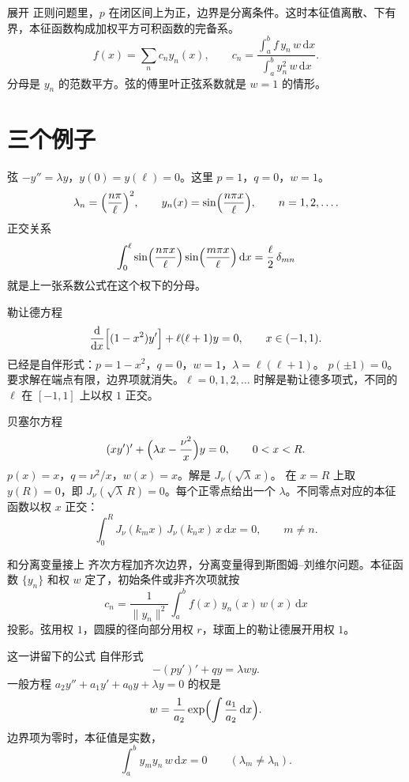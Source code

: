 \documentclass[fontset=windows, chinese, 10pt, xcolor=dvipsnames]{beamer}
\begin{document}
\begin{frame}{展开}
  正则问题里，$p$ 在闭区间上为正，边界是分离条件。这时本征值离散、下有界，本征函数构成加权平方可积函数的完备系。
  \vspace{0.35em}
  \[
    f(x)=\sum_n c_n y_n(x),
    \qquad
    c_n
    =\frac{\displaystyle\int_a^b f\,y_n\,w\,\mathrm{d}x}
          {\displaystyle\int_a^b y_n^2\,w\,\mathrm{d}x}.
  \]
  分母是 $y_n$ 的范数平方。弦的傅里叶正弦系数就是 $w=1$ 的情形。
\end{frame}

\section{三个例子}

\begin{frame}{弦}
  $-y''=\lambda y$，$y(0)=y(\ell)=0$。这里 $p=1$，$q=0$，$w=1$。
  \[
    \lambda_n=\Bigl(\frac{n\pi}{\ell}\Bigr)^2,
    \qquad
    y_n(x)=\sin\Bigl(\frac{n\pi x}{\ell}\Bigr),
    \qquad n=1,2,\ldots.
  \]
  正交关系
  \[
    \int_0^{\ell}
      \sin\Bigl(\frac{n\pi x}{\ell}\Bigr)
      \sin\Bigl(\frac{m\pi x}{\ell}\Bigr)
      \,\mathrm{d}x
    =\frac{\ell}{2}\,\delta_{mn}
  \]
  就是上一张系数公式在这个权下的分母。
\end{frame}

\begin{frame}{勒让德方程}
  \[
    \frac{\mathrm{d}}{\mathrm{d}x}\Bigl[(1-x^2)y'\Bigr]
    +\ell(\ell+1)y=0,
    \qquad x\in(-1,1).
  \]
  已经是自伴形式：$p=1-x^2$，$q=0$，$w=1$，$\lambda=\ell(\ell+1)$。
  \vspace{0.3em}
  $p(\pm 1)=0$。要求解在端点有限，边界项就消失。$\ell=0,1,2,\ldots$ 时解是勒让德多项式，不同的 $\ell$ 在 $[-1,1]$ 上以权 $1$ 正交。
\end{frame}

\begin{frame}{贝塞尔方程}
  \[
    (x y')'+\Bigl(\lambda x-\frac{\nu^2}{x}\Bigr)y=0,
    \qquad 0<x<R.
  \]
  $p(x)=x$，$q=\nu^2/x$，$w(x)=x$。解是 $J_{\nu}(\sqrt{\lambda}\,x)$。
  \vspace{0.3em}
  在 $x=R$ 上取 $y(R)=0$，即 $J_{\nu}(\sqrt{\lambda}\,R)=0$。每个正零点给出一个 $\lambda$。不同零点对应的本征函数以权 $x$ 正交：
  \[
    \int_0^R J_{\nu}(k_m x)\,J_{\nu}(k_n x)\,x\,\mathrm{d}x=0,
    \qquad m\neq n.
  \]
\end{frame}

\begin{frame}{和分离变量接上}
  齐次方程加齐次边界，分离变量得到斯图姆--刘维尔问题。本征函数 $\{y_n\}$ 和权 $w$ 定了，初始条件或非齐次项就按
  \[
    c_n
    =\frac{1}{\|y_n\|^2}
     \int_a^b f(x)\,y_n(x)\,w(x)\,\mathrm{d}x
  \]
  投影。弦用权 $1$，圆膜的径向部分用权 $r$，球面上的勒让德展开用权 $1$。
\end{frame}

\begin{frame}{这一讲留下的公式}
  自伴形式
  \[
    -(p y')'+q y=\lambda w y.
  \]
  一般方程 $a_2 y''+a_1 y'+a_0 y+\lambda y=0$ 的权是
  \[
    w=\frac{1}{a_2}
    \exp\Bigl(\int\frac{a_1}{a_2}\,\mathrm{d}x\Bigr).
  \]
  边界项为零时，本征值是实数，
  \[
    \int_a^b y_m y_n\,w\,\mathrm{d}x=0
    \qquad(\lambda_m\neq\lambda_n).
  \]
\end{frame}
\end{document}
